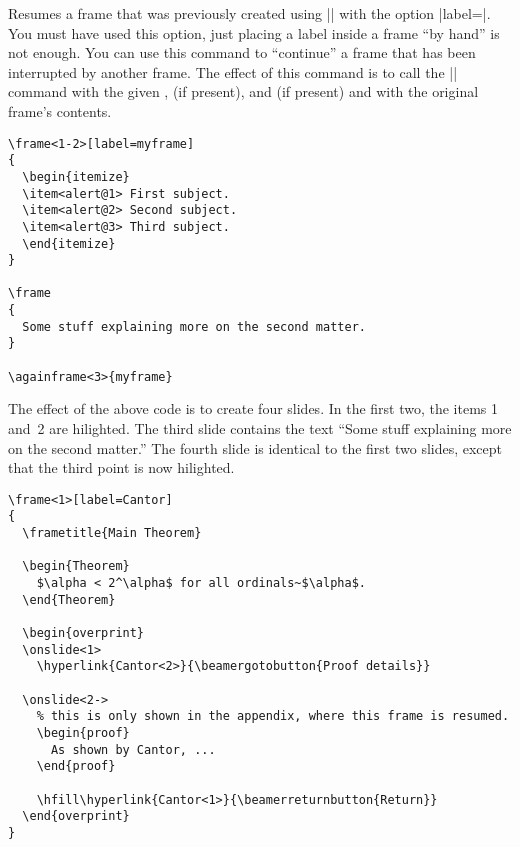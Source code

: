 \begin{command}{\againframe{}}
  \beamernote
  Resumes a frame that was previously created using |\frame|
  with the option |label=|. You must have used this option,
  just placing a label inside a frame ``by hand'' is not enough. You
  can use this command to ``continue'' a frame that has been
  interrupted by another frame. The effect of this command is to call
  the |\frame| command with the given ,
   (if present), and
   (if present) and with the original frame's contents. 

  \example
\begin{verbatim}
\frame<1-2>[label=myframe]
{
  \begin{itemize}
  \item<alert@1> First subject.
  \item<alert@2> Second subject.
  \item<alert@3> Third subject.
  \end{itemize}
}

\frame
{
  Some stuff explaining more on the second matter.
}

\againframe<3>{myframe}
\end{verbatim}
  The effect of the above code is to create four slides. In the first
  two, the items 1 and~2 are hilighted. The third slide contains the
  text ``Some stuff explaining more on the second matter.'' The fourth
  slide is identical to the first two slides, except that the third
  point is now hilighted.

  \example
\begin{verbatim}
\frame<1>[label=Cantor]
{
  \frametitle{Main Theorem}

  \begin{Theorem}
    $\alpha < 2^\alpha$ for all ordinals~$\alpha$.
  \end{Theorem}

  \begin{overprint}
  \onslide<1>
    \hyperlink{Cantor<2>}{\beamergotobutton{Proof details}}

  \onslide<2->
    % this is only shown in the appendix, where this frame is resumed.
    \begin{proof}
      As shown by Cantor, ...
    \end{proof}

    \hfill\hyperlink{Cantor<1>}{\beamerreturnbutton{Return}}
  \end{overprint}
}


\end{verbatim}
\end{command}

